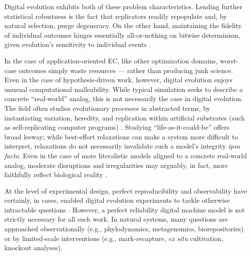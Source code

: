 Digital evolution exhibits both of these problem characteristics.
Lending further statistical robustness is the fact that replicators readily repopulate \cite{lyu2021improving,lyu2023online} and, by natural selection, purge degeneracy.
On the other hand, maintaining the fidelity of individual outcomes hinges essentially all-or-nothing on bitwise determinism, given evolution's sensitivity to individual events \cite{ferguson2023potentiating}.

In the case of application-oriented EC, like other optimization domains, worst-case outcomes simply waste resources --- rather than producing junk science.
Even in the case of hypothesis-driven work, however, digital evolution enjoys unusual computational malleability.
While typical simulation seeks to describe a concrete ``real-world'' analog, this is not necessarily the case in digital evolution.
The field often studies evolutionary processes in abstracted terms, by instantiating variation, heredity, and replication within artificial substrates (such as self-replicating computer programs) \cite{pennock2007models,bonabeau1994we}.
Studying ``life-as-it-could-be'' offers broad leeway;
while best-effort relaxations can make a system more difficult to interpret, relaxations do not necessarily invalidate such a model's integrity \textit{ipso facto}.
Even in the case of more literalistic models aligned to a concrete real-world analog, moderate disruptions and irregularities may arguably, in fact, more faithfully reflect biological reality \cite{huberman1993evolutionary}.


At the level of experimental design, perfect reproducibility and observability have certainly, in cases, enabled digital evolution experiments to tackle otherwise intractable questions \cite{pontes2020evolutionary,lenski2003evolutionary,grabowski2013case,dolson2020interpreting,fortuna2019coevolutionary,goldsby2014evolutionary,covert2013experiments,zaman2011rapid,bundy2021footprint,dolson2017spatial}.
However, a perfect reliability digital machine model is not strictly necessary for all such work.
In natural systems, many questions are approached observationally (e.g., phylodynamics, metagenomics, biorepositories) or by limited-scale interventions (e.g., mark-recapture, \textit{ex situ} cultivation, knockout analyses).

